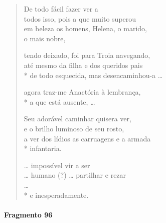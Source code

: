 {\begin{verse}
De todo fácil fazer ver a\\
todos isso, pois a que muito superou\\			%
em beleza os homens, Helena, o marido, \\
o mais nobre,

tendo deixado, foi para Troia navegando,\\
até mesmo da filha e dos queridos pais\\*
de todo esquecida, mas desencaminhou-a \ldots{}

agora traz-me Anactória à lembrança,\\*
a que está ausente, \ldots{}

Seu adorável caminhar quisera ver,\\
e o brilho luminoso de seu rosto,\\
a ver dos lídios as carruagens e a armada\\*
infantaria.

\ldots{} impossível vir a ser\\
\ldots{} humano (?) \ldots{} partilhar e rezar\\
\ldots{}\\*
e inesperadamente.
\end{verse}


\paragraph{Fragmento 96}

}
